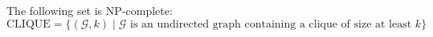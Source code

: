 
\begin{theorem}
	The following set is NP-complete:
	\[\text{CLIQUE} = \{(\mathcal{G}, k) \mid \mathcal{G} \text{ is an undirected graph containing a clique of size at least } k \}\]
\end{theorem}

